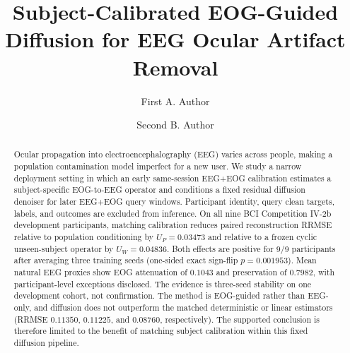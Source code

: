 \documentclass[acmsmall,screen,review]{acmart}
\begin{document}
\title[Subject-Calibrated EOG-Guided Diffusion]{Subject-Calibrated EOG-Guided Diffusion for EEG Ocular Artifact Removal}

\author{First A. Author}
\correspondingauthor
{}

\author{Second B. Author}

\renewcommand{\shortauthors}{Author et al.}

\begin{abstract}
Ocular propagation into electroencephalography (EEG) varies across people,
making a population contamination model imperfect for a new user.  We study a
narrow deployment setting in which an early same-session EEG+EOG calibration
estimates a subject-specific EOG-to-EEG operator and conditions a fixed residual
diffusion denoiser for later EEG+EOG query windows.  Participant identity,
query clean targets, labels, and outcomes are excluded from inference.  On all
nine BCI Competition IV-2b development participants, matching calibration
reduces paired reconstruction RRMSE relative to population conditioning by
$U_P=0.03473$ and relative to a frozen cyclic unseen-subject operator by
$U_W=0.04836$.  Both effects are positive for 9/9 participants after averaging
three training seeds (one-sided exact sign-flip $p=0.001953$).  Mean natural
EEG proxies show EOG attenuation of $0.1043$ and preservation of $0.7982$,
with participant-level exceptions disclosed.  The evidence is three-seed
stability on one development cohort, not confirmation.  The method is
EOG-guided rather than EEG-only, and diffusion does not outperform the matched
deterministic or linear estimators (RRMSE $0.11350$, $0.11225$, and $0.08760$,
respectively).  The supported conclusion is therefore limited to the benefit
of matching subject calibration within this fixed diffusion pipeline.
\end{abstract}
\end{document}
